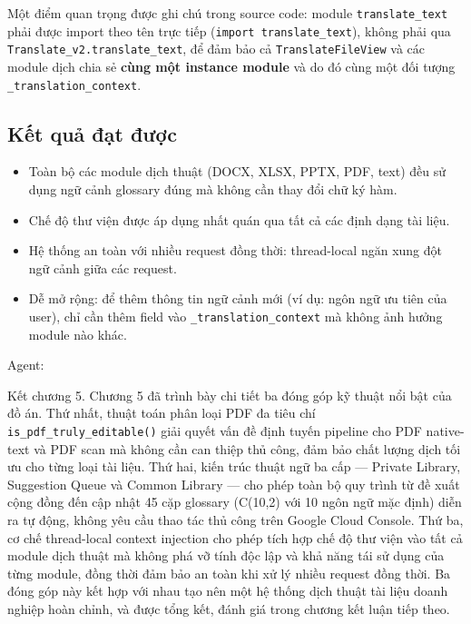 Một điểm quan trọng được ghi chú trong source code: module \texttt{translate\_text} phải được
import theo tên trực tiếp (\texttt{import translate\_text}), không phải qua
\texttt{Translate\_v2.translate\_text}, để đảm bảo cả \texttt{TranslateFileView} và các module
dịch chia sẻ \textbf{cùng một instance module} và do đó cùng một đối tượng
\texttt{\_translation\_context}.

\subsection{Kết quả đạt được}

\begin{itemize}
  \item Toàn bộ các module dịch thuật (DOCX, XLSX, PPTX, PDF, text) đều sử dụng ngữ cảnh
    glossary đúng mà không cần thay đổi chữ ký hàm.
  \item Chế độ thư viện được áp dụng nhất quán qua tất cả các định dạng tài liệu.
  \item Hệ thống an toàn với nhiều request đồng thời: thread-local ngăn xung đột ngữ cảnh
    giữa các request.
  \item Dễ mở rộng: để thêm thông tin ngữ cảnh mới (ví dụ: ngôn ngữ ưu tiên của user), chỉ
    cần thêm field vào \texttt{\_translation\_context} mà không ảnh hưởng module nào khác.
\end{itemize}

Agent:

Kết chương 5. Chương 5 đã trình bày chi tiết ba đóng góp kỹ thuật nổi bật của đồ án. Thứ nhất, thuật toán phân loại PDF đa tiêu chí \texttt{is\_pdf\_truly\_editable()} giải quyết vấn đề định tuyến pipeline cho PDF native-text và PDF scan mà không cần can thiệp thủ công, đảm bảo chất lượng dịch tối ưu cho từng loại tài liệu. Thứ hai, kiến trúc thuật ngữ ba cấp --- Private Library, Suggestion Queue và Common Library --- cho phép toàn bộ quy trình từ đề xuất cộng đồng đến cập nhật 45 cặp glossary (C(10,2) với 10 ngôn ngữ mặc định) diễn ra tự động, không yêu cầu thao tác thủ công trên Google Cloud Console. Thứ ba, cơ chế thread-local context injection cho phép tích hợp chế độ thư viện vào tất cả module dịch thuật mà không phá vỡ tính độc lập và khả năng tái sử dụng của từng module, đồng thời đảm bảo an toàn khi xử lý nhiều request đồng thời. Ba đóng góp này kết hợp với nhau tạo nên một hệ thống dịch thuật tài liệu doanh nghiệp hoàn chỉnh, và được tổng kết, đánh giá trong chương kết luận tiếp theo.
